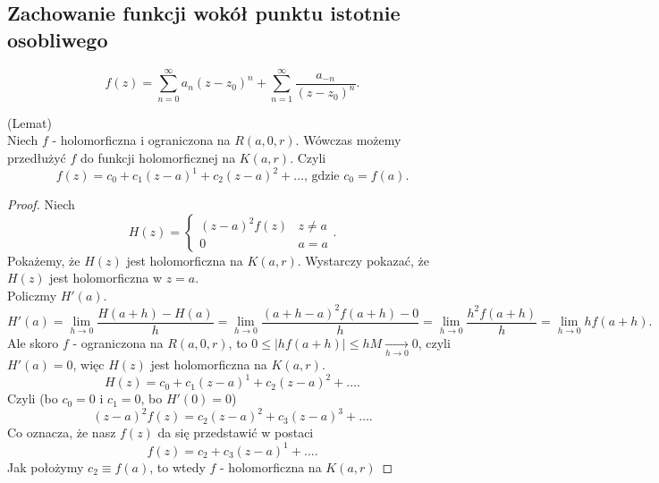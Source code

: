 \documentclass[../main.tex]{subfiles}
\begin{document}
\subsection{Zachowanie funkcji wokół punktu istotnie osobliwego}
\[
    f(z) = \sum_{n=0}^{\infty} a_n(z-z_0)^n + \sum_{n=1}^{\infty} \frac{a_{-n}}{(z-z_0)^n}
.\]
\pagebreak
\begin{tw}
    (Lemat)\\
    Niech $f$ - holomorficzna i ograniczona na $R(a,0,r)$. Wówczas możemy przedłużyć $f$ do funkcji holomorficznej na $K(a,r)$. Czyli
    \[
        f(z) = c_0 + c_1(z-a)^1 + c_2(z-a)^2 + \ldots\text{, gdzie } c_0 = f(a)
    .\]
\end{tw}
\begin{proof}
    Niech
    \[H(z) = \begin{cases}
        (z-a)^2f(z)& z\neq a\\ 0 & a = a
    \end{cases}
    .\]
    Pokażemy, że $H(z)$ jest holomorficzna na $K(a,r)$. Wystarczy pokazać, że $H(z)$ jest holomorficzna w $z = a$. \\
    Policzmy $H'(a)$.
    \[
        H'(a) = \lim\limits_{h\to 0}\frac{H(a+h) - H(a)}{h} = \lim\limits_{h\to 0}\frac{(a+h-a)^2f(a+h) - 0}{h} = \lim\limits_{h\to 0}\frac{h^2f(a+h)}{h} = \lim\limits_{h\to 0} hf(a+h)
    .\]
Ale skoro $f$ - ograniczona na $R(a,0,r)$, to $0 \le \left| h f(a+h) \right| \le h M \underset{h\to 0}{\longrightarrow} 0$, czyli $H'(a) = 0$, więc $H(z)$ jest holomorficzna na $K(a,r)$.
\[
    H(z) = c_0 + c_1(z-a)^1 + c_2(z-a)^2 + \ldots
.\]
Czyli (bo $c_0 = 0$ i $c_1 = 0$, bo $H'(0) = 0$)
\[
    (z-a)^2f(z) = c_2(z-a)^2 + c_3(z-a)^3 + \ldots
.\]
Co oznacza, że nasz $f(z)$ da się przedstawić w postaci
\[
    f(z) = c_2 + c_3(z-a)^1 + \ldots
.\]
Jak położymy $c_2 \equiv f(a)$, to wtedy $f$ - holomorficzna na $K(a,r)$
\end{proof}
\end{document}
